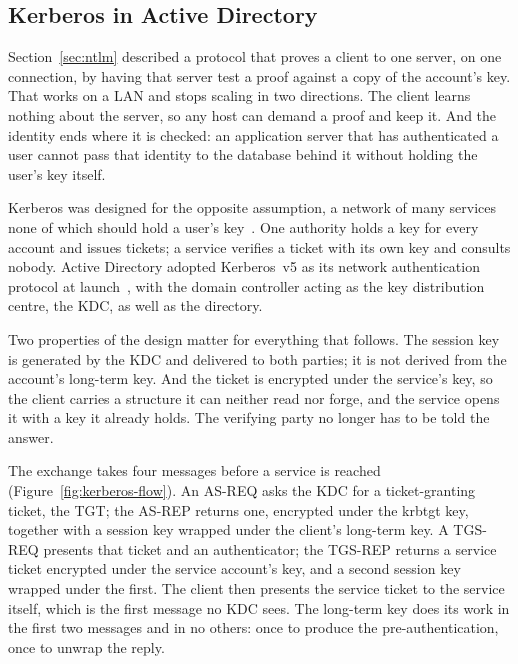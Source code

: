 \subsection{Kerberos in Active Directory}
\label{sec:kerberos}

Section~\ref{sec:ntlm} described a protocol that proves a client to one server, on one connection,
by having that server test a proof against a copy of the account's key. That works on a LAN and
stops scaling in two directions. The client learns nothing about the server, so any host can demand
a proof and keep it. And the identity ends where it is checked: an application server that has
authenticated a user cannot pass that identity to the database behind it without holding the user's
key itself.

Kerberos was designed for the opposite assumption, a network of many services none of which should
hold a user's key~\cite{neuman-tso}. One authority holds a key for every account and issues tickets;
a service verifies a ticket with its own key and consults nobody. Active Directory adopted
Kerberos~v5 as its network authentication protocol at launch~\cite{windows-internals}, with the
domain controller acting as the key distribution centre, the KDC, as well as the directory.

Two properties of the design matter for everything that follows. The session key is generated by the
KDC and delivered to both parties; it is not derived from the account's long-term key. And the ticket
is encrypted under the service's key, so the client carries a structure it can neither read nor
forge, and the service opens it with a key it already holds. The verifying party no longer has to be
told the answer.

The exchange takes four messages before a service is reached (Figure~\ref{fig:kerberos-flow}). An
AS-REQ asks the KDC for a \mbox{ticket-granting} ticket, the TGT; the AS-REP returns one, encrypted
under the krbtgt key, together with a session key wrapped under the client's long-term key. A TGS-REQ
presents that ticket and an authenticator; the TGS-REP returns a service ticket encrypted under the
service account's key, and a second session key wrapped under the first. The client then presents the
service ticket to the service itself, which is the first message no KDC sees. The long-term key does
its work in the first two messages and in no others: once to produce the pre-authentication, once to
unwrap the reply.



